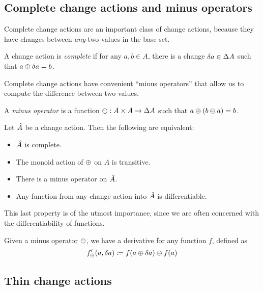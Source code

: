 \subsection{Complete change actions and minus operators}

Complete change actions are an important class of change actions, because they
have changes between \emph{any} two values in the base set.

\begin{defn}
  A change action is \emph{complete} if for any $a, b \in A$, there is
  a change $\delta a \in \Delta A$ such that $a \oplus \delta a = b$.
\end{defn}

Complete change actions have convenient ``minus operators'' that allow us to
compute the difference between two values.

\begin{defn}
  A \emph{minus operator} is a function $\ominus: A \times A \rightarrow \Delta A$ such that $a \oplus (b \ominus a) = b$.
\end{defn}

\begin{prop}
  Let $\hat{A}$ be a change action. Then the following are equivalent:
  \begin{itemize}
    \item $\hat{A}$ is complete.
    \item The monoid action of $\oplus$ on $A$ is transitive.
    \item There is a minus operator on $\hat{A}$.
    \item Any function from any change action into $\hat{A}$ is differentiable.
  \end{itemize}
\end{prop}

This last property is of the utmost importance, since we are often concerned with the differentiability
of functions.

\begin{defn}
  Given a minus operator $\ominus$, we have a derivative for any function $f$,
  defined as
  \begin{displaymath}
    f'_\ominus(a, \delta a) \coloneqq f(a \oplus \delta a) \ominus f(a)
  \end{displaymath}
\end{defn}

\subsection{Thin change actions}
\label{sec:thin}

